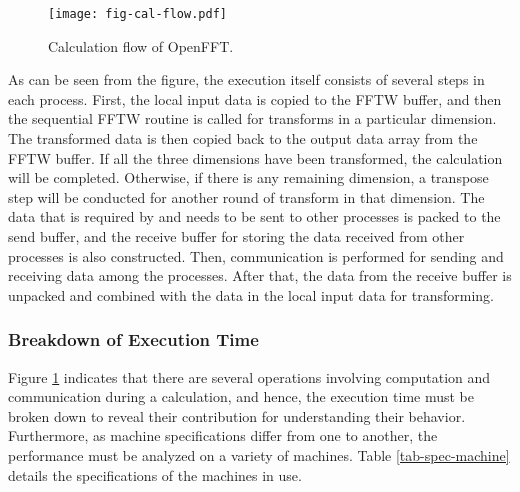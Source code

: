 \begin{figure}[htbp]
\begin{center}
\texttt{[image: fig-cal-flow.pdf]}
\end{center}
\caption{Calculation flow of OpenFFT.}
\label{fig-cal-flow}
\end{figure}

As can be seen from the figure, the execution itself consists of several steps in each process. First, the local input data is copied to the FFTW buffer, and then the sequential FFTW routine is called for transforms in a particular dimension. The transformed data is then copied back to the output data array from the FFTW buffer. If all the three dimensions have been transformed, the calculation will be completed. Otherwise, if there is any remaining dimension, a transpose step will be conducted for another round of transform in that dimension. The data that is required by and needs to be sent to other processes is packed to the send buffer, and the receive buffer for storing the data received from other processes is also constructed. Then, communication is performed for sending and receiving data among the processes. After that, the data from the receive buffer is unpacked and combined with the data in the local input data for transforming.  

\subsubsection{Breakdown of Execution Time}

Figure \ref{fig-cal-flow} indicates that there are several operations involving computation and communication during a calculation, and hence, the execution time must be broken down to reveal their contribution for understanding their behavior. Furthermore, as machine specifications differ from one to another, the performance must be analyzed on a variety of machines. Table \ref{tab-spec-machine} details the specifications of the machines in use.

